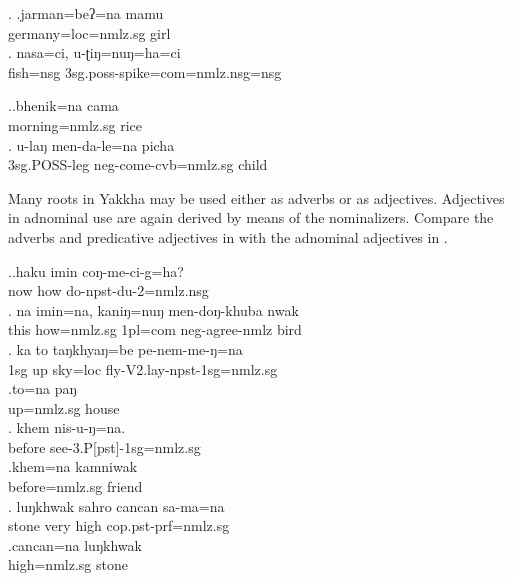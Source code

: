 \ex. \ag.jarman=beʔ=na mamu\\ 
	germany{\sc =loc=nmlz.sg} girl		\\ 
	\bg. nasa=ci, u-ʈiŋ=nuŋ=ha=ci\\
		fish{\sc =nsg}	{\sc 3sg.poss-}spike{\sc =com=nmlz.nsg=nsg}\\
			 
			
		
			
 	\ex.\ag.bhenik=na cama\\
	morning{\sc =nmlz.sg} rice\\
	 \bg. u-laŋ men-da-le=na picha\\ 
	{\sc 3sg.POSS}-leg {\sc neg-}come-{\sc cvb=nmlz.sg} child\\ 

	
Many roots in Yakkha may be used either as adverbs or as adjectives. Adjectives in adnominal use are again derived by means of the nominalizers. Compare the adverbs and predicative adjectives in \Next[a, c, e, g]  with the adnominal adjectives in \Next[b, d, f, h].
	
 

\ex.\ag.haku imin coŋ-me-ci-g=ha?\\
	now how do{\sc -npst-du-2=nmlz.nsg}{\sc }{\sc }	\\
	 
 	\bg. na  imin=na,        kaniŋ=nuŋ   men-doŋ-khuba     nwak\\
	this how{\sc =nmlz.sg} {\sc 1pl=com} {\sc neg}-agree-{\sc nmlz} bird		\\
	 
	\bg. ka to taŋkhyaŋ=be   pe-nem-me-ŋ=na\\ 
	{\sc 1sg} up sky{\sc =loc} fly-{\sc V2.lay-npst-1sg=nmlz.sg}		\\ 
	 
	\bg.to=na paŋ\\
	up{\sc =nmlz.sg} house		\\
	 \bg. khem nis-u-ŋ=na.\\ 
	before see-{\sc 3.P[pst]-1sg=nmlz.sg}		\\ 
	\bg.khem=na  kamniwak\\
	before{\sc =nmlz.sg}  friend\\
	\bg.  luŋkhwak sahro cancan sa-ma=na\\
	stone very high {\sc cop.pst-prf=nmlz.sg}	\\
	 
 	\bg.cancan=na luŋkhwak\\
	high{\sc =nmlz.sg} stone\\


